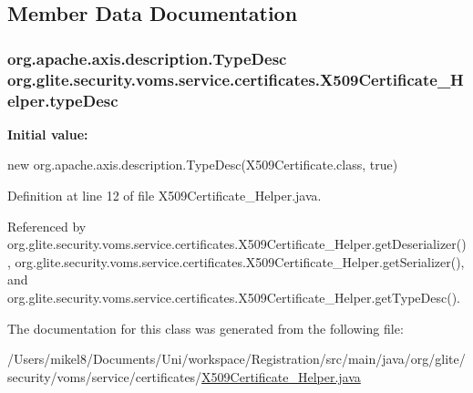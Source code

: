 \subsection{Member Data Documentation}
\hypertarget{classorg_1_1glite_1_1security_1_1voms_1_1service_1_1certificates_1_1X509Certificate__Helper_ac7c60205759f7891f36ca756d0ce950f}{
\subsubsection[{typeDesc}]{\setlength{\rightskip}{0pt plus 5cm}org.apache.axis.description.TypeDesc {\bf org.glite.security.voms.service.certificates.X509Certificate\_\-Helper.typeDesc}}}
\label{classorg_1_1glite_1_1security_1_1voms_1_1service_1_1certificates_1_1X509Certificate__Helper_ac7c60205759f7891f36ca756d0ce950f}
{\bfseries Initial value:}
\begin{DoxyCode}

        new org.apache.axis.description.TypeDesc(X509Certificate.class, true)
\end{DoxyCode}


Definition at line 12 of file X509Certificate\_\-Helper.java.



Referenced by org.glite.security.voms.service.certificates.X509Certificate\_\-Helper.getDeserializer(), org.glite.security.voms.service.certificates.X509Certificate\_\-Helper.getSerializer(), and org.glite.security.voms.service.certificates.X509Certificate\_\-Helper.getTypeDesc().



The documentation for this class was generated from the following file:\begin{DoxyCompactItemize}
\item 
/Users/mikel8/Documents/Uni/workspace/Registration/src/main/java/org/glite/security/voms/service/certificates/\hyperlink{X509Certificate__Helper_8java}{X509Certificate\_\-Helper.java}\end{DoxyCompactItemize}
